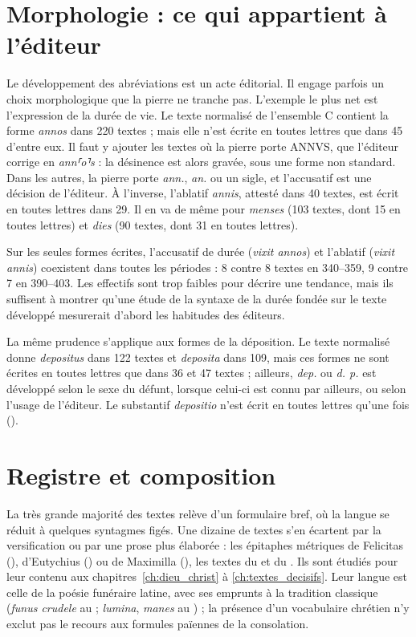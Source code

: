 

\section{Morphologie : ce qui appartient à l’éditeur}

Le développement des abréviations est un acte éditorial. Il engage parfois un choix morphologique que la pierre ne tranche pas. L’exemple le plus net est l’expression de la durée de vie. Le texte normalisé de l’ensemble C contient la forme \emph{annos} dans 220 textes ; mais elle n’est écrite en toutes lettres que dans 45 d’entre eux. Il faut y ajouter les textes où la pierre porte ANNVS, que l’éditeur corrige en \emph{ann⸢o⸣s} : la désinence est alors gravée, sous une forme non standard. Dans les autres, la pierre porte \emph{ann.}, \emph{an.} ou un sigle, et l’accusatif est une décision de l’éditeur. À l’inverse, l’ablatif \emph{annis}, attesté dans 40 textes, est écrit en toutes lettres dans 29. Il en va de même pour \emph{menses} (103 textes, dont 15 en toutes lettres) et \emph{dies} (90 textes, dont 31 en toutes lettres).

Sur les seules formes écrites, l’accusatif de durée (\emph{vixit annos}) et l’ablatif (\emph{vixit annis}) coexistent dans toutes les périodes : 8 contre 8 textes en 340–359, 9 contre 7 en 390–403. Les effectifs sont trop faibles pour décrire une tendance, mais ils suffisent à montrer qu’une étude de la syntaxe de la durée fondée sur le texte développé mesurerait d’abord les habitudes des éditeurs.

La même prudence s’applique aux formes de la déposition. Le texte normalisé donne \emph{depositus} dans 122 textes et \emph{deposita} dans 109, mais ces formes ne sont écrites en toutes lettres que dans 36 et 47 textes ; ailleurs, \emph{dep.} ou \emph{d. p.} est développé selon le sexe du défunt, lorsque celui-ci est connu par ailleurs, ou selon l’usage de l’éditeur. Le substantif \emph{depositio} n’est écrit en toutes lettres qu’une fois ().

\section{Registre et composition}

La très grande majorité des textes relève d’un formulaire bref, où la langue se réduit à quelques syntagmes figés. Une dizaine de textes s’en écartent par la versification ou par une prose plus élaborée : les épitaphes métriques de Felicitas (), d’Eutychius () ou de Maximilla (), les textes du  et du . Ils sont étudiés pour leur contenu aux chapitres~\ref{ch:dieu_christ} à \ref{ch:textes_decisifs}. Leur langue est celle de la poésie funéraire latine, avec ses emprunts à la tradition classique (\emph{funus crudele} au  ; \emph{lumina}, \emph{manes} au ) ; la présence d’un vocabulaire chrétien n’y exclut pas le recours aux formules païennes de la consolation.
